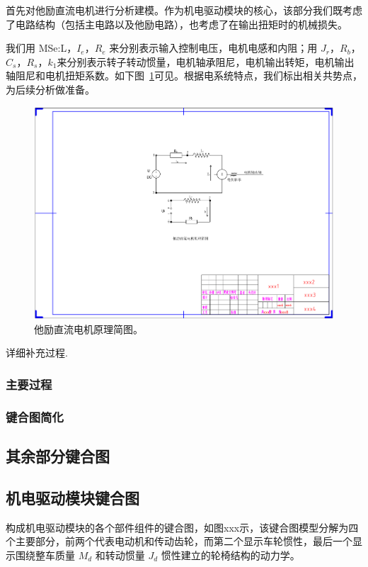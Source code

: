 首先对他励直流电机进行分析建模。作为机电驱动模块的核心，该部分我们既考虑了电路结构（包括主电路以及他励电路），也考虑了在输出扭矩时的机械损失。

我们用 MSe:L，$ I_e $，$ R_e $ 来分别表示输入控制电压，电机电感和内阻；用 $ J_r $，$ R_b $，$ C_s $，$ R_s $，$ k_1 $来分别表示转子转动惯量，电机轴承阻尼，电机输出转矩，电机输出轴阻尼和电机扭矩系数。如下图~\ref{fig:separately_excited_dc_motor}可见。根据电系统特点，我们标出相关共势点，为后续分析做准备。

\begin{figure}[!h]
	\centering
	\includegraphics[width=1.1\textwidth]{fig/separately_excited_dc_motor.pdf}
	\caption{他励直流电机原理简图。}\label{fig:separately_excited_dc_motor} %
\end{figure}

详细补充过程.

\subsubsection{主要过程}


\subsubsection{键合图简化}



\subsection{其余部分键合图}



\subsection{机电驱动模块键合图}

构成机电驱动模块的各个部件组件的键合图，如图xxx示，该键合图模型分解为四个主要部分，前两个代表电动机和传动齿轮，而第二个显示车轮惯性，最后一个显示围绕整车质量 $M_d$ 和转动惯量 $J_d$ 惯性建立的轮椅结构的动力学。


